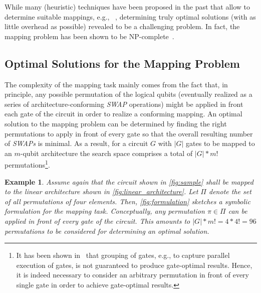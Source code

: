 \documentclass[10pt,conference]{IEEEtran}
\newtheorem{example}{Example}
\begin{document}
While many (heuristic) techniques have been proposed in the past that allow to determine suitable mappings, e.g., ~\mbox{\cite{zulehnerEfficientMethodologyMapping2019, smithQuantumComputationalCompiler2019, liTacklingQubitMapping2019, matsuoReducingOverheadMapping2019, muraliNoiseadaptiveCompilerMappings2019,amyStaqFullstackQuantum2019,sivarajahKetRetargetableCompiler2020, hirataEfficientConversionQuantum2011, zulehnerCompilingSUQuantum2019}}, determining truly optimal solutions (with as little overhead as possible) revealed to be a challenging problem.
In fact, the mapping problem has been shown to be NP-complete~\cite{boteaComplexityQuantumCircuit2018, siraichiQubitAllocation2018}.

\subsection{Optimal Solutions for the Mapping Problem}\label{sec:sat}

The complexity of the mapping task mainly comes from the fact that, in principle, any possible permutation of the logical qubits (eventually realized as a series of \mbox{architecture-conforming} \textit{SWAP} operations) might be applied in front each gate of the circuit in order to realize a conforming mapping.
An optimal solution to the mapping problem can be determined by finding the right permutations to apply in front of every gate so that the overall resulting number of \textit{SWAPs} is minimal.
As a result, for a circuit $G$ with $|G|$ gates to be mapped to an \mbox{$m$-qubit} architecture the search space comprises a total of $|G|*m!$ permutations\footnote{
It has been shown in~\cite{willeMappingQuantumCircuits2019} that grouping of gates, e.g., to capture parallel execution of gates, is not guaranteed to produce gate-optimal results. Hence, it is indeed necessary to consider an arbitrary permutation in front of every single gate in order to achieve gate-optimal results.}.

\begin{example}\label{ex:symbolic}
	Assume again that the circuit shown in \autoref{fig:sample} shall be mapped to the linear architecture shown in \autoref{fig:linear_architecture}. 
	Let $\Pi$ denote the set of all permutations of four elements.
	Then, \autoref{fig:formulation} sketches a symbolic formulation for the mapping task.
	Conceptually, any permutation $\pi\in\Pi$ can be applied in front of every gate of the circuit.
	This amounts to \mbox{$|G|*m!=4*4!=96$} permutations to be considered for determining an optimal solution.
\end{example}
\end{document}

